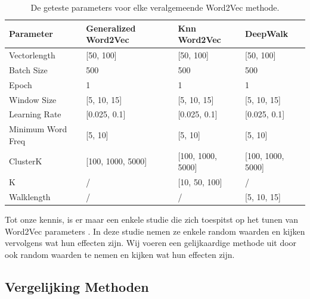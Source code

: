 \documentclass[11pt, final, journal, twoside, a4paper]{IEEEtran}
\begin{document}
\begin{table}[!htb]
\centering

\begin{tabular}{llll}
\hline
Parameter                                    & Generalized Word2Vec  & Knn Word2Vec          & DeepWalk              \\ \hline
\multicolumn{1}{l|}{Vectorlength}            & {[}50, 100{]}         & {[}50, 100{]}         & {[}50, 100{]}         \\
\multicolumn{1}{l|}{Batch Size}              & 500                   & 500                   & 500                   \\
\multicolumn{1}{l|}{Epoch}                   & 1                     & 1                     & 1                     \\
\multicolumn{1}{l|}{Window Size}             & {[}5, 10, 15{]}       & {[}5, 10, 15{]}       & {[}5, 10, 15{]}       \\
\multicolumn{1}{l|}{Learning Rate}           & {[}0.025, 0.1{]}      & {[}0.025, 0.1{]}      & {[}0.025, 0.1{]}      \\
\multicolumn{1}{l|}{Minimum Word Freq} & {[}5, 10{]}           & {[}5, 10{]}           & {[}5, 10{]}           \\
\multicolumn{1}{l|}{ClusterK}                & {[}100, 1000, 5000{]} & {[}100, 1000, 5000{]} & {[}100, 1000, 5000{]} \\
\multicolumn{1}{l|}{K}                       & /                     & {[}10, 50, 100{]}     & /                     \\
\multicolumn{1}{l|}{Walklength}              & /                     & /                     & {[}5, 10, 15{]}      
\end{tabular}

\caption{De geteste parameters voor elke veralgemeende Word2Vec methode.}
\label{tab:parameters}
\end{table}

Tot onze kennis, is er maar een enkele studie die zich toespitst op het tunen van Word2Vec parameters \cite{w2vTuning:article}. In deze studie nemen ze enkele random waarden en kijken vervolgens wat hun effecten zijn. Wij voeren een gelijkaardige methode uit door ook random waarden te nemen en kijken wat hun effecten zijn.

\subsection{Vergelijking Methoden}
\end{document}
